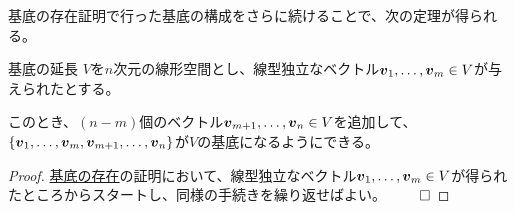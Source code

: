\documentclass[../../../topic_linear-algebra]{subfiles}
\begin{document}
基底の存在証明で行った基底の構成をさらに続けることで、次の定理が得られる。

\begin{theorem}{基底の延長}\label{thm:basis-extension}
  $V$を$n$次元の線形空間とし、線型独立なベクトル$\vb*{v}_1, \dots, \vb*{v}_m \in V$が与えられたとする。

  このとき、$(n-m)$個のベクトル$\vb*{v}_{m+1}, \dots, \vb*{v}_n \in V$を追加して、$\{ \vb*{v}_1, \dots, \vb*{v}_m, \vb*{v}_{m+1}, \dots, \vb*{v}_n \}$が$V$の基底になるようにできる。
\end{theorem}

\begin{proof}
  \hyperref[thm:existence-of-basis]{基底の存在}の証明において、線型独立なベクトル$\vb*{v}_1, \dots, \vb*{v}_m \in V$が得られたところからスタートし、同様の手続きを繰り返せばよい。 $\qed$
\end{proof}
\end{document}
